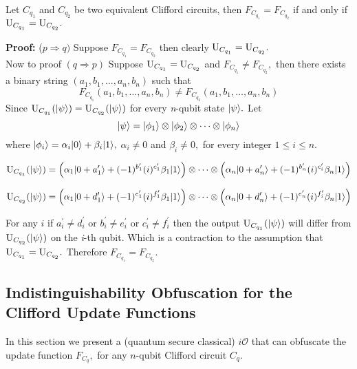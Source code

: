 \begin{lemma}
\label{sec:Clifford Functions Equivalence}
Let $C_{q_1}$ and $C_{q_2}$ be two equivalent Clifford circuits, then $F_{C_{q_1}}=F_{C_{q_2}}$ if and only if ${\rm U}_{C_{q_1}}={\rm U}_{C_{q_2}}.$
\end{lemma}
{\bf Proof:} ($p\Rightarrow q)$ Suppose $F_{C_{q_1}}=F_{C_{q_2}}$ then clearly ${\rm U}_{C_{q_1}}={\rm U}_{C_{q_2}}.$\\

		Now to proof $(q\Rightarrow p)$ Suppose ${\rm U}_{C_{q_1}}={\rm U}_{C_{q_2}}$ and $F_{C_{q_1}}\neq F_{C_{q_2}},$ then there exists a binary string $(a_1,b_1,\ldots, a_n,b_n)$ such that
		  $$ F_{C_{q_1}}(a_1,b_1,\ldots, a_n,b_n)\neq F_{C_{q_2}}(a_1,b_1,\ldots, a_n,b_n)$$
		  Since ${\rm U}_{C_{q_1}}({{\lvert}\psi\rangle})={\rm U}_{C_{q_2}}({{\lvert}\psi\rangle})$ for every {\em n}-qubit state ${{\lvert}\psi\rangle}.$ Let  $${{\lvert}\psi\rangle}={{\lvert}\phi_1\rangle} \otimes {{\lvert}\phi_2\rangle}\otimes \cdots \otimes {{\lvert}\phi_n\rangle}$$
		   where ${{\lvert}\phi_i\rangle} =\alpha_i {{\lvert}0\rangle}+ \beta_i{{\lvert}1\rangle},$  $\alpha_i\neq 0$ and $\beta_i\neq 0,$ for every integer $1\leq i\leq n.$
		
		  $${\rm U}_{C_{q_1}}({{\lvert}\psi\rangle})=\left(\alpha_1 {{\lvert}0+a^\prime_1\rangle}+(-1)^{b^\prime_1} (i)^{c^\prime_1} \beta_1{{\lvert}1\rangle}\right) \otimes \dots \otimes  \left(\alpha_n {{\lvert}0+a^\prime_n\rangle}+(-1)^{b^\prime_n} (i)^{c^\prime_i} \beta_n{{\lvert}1\rangle}\right)$$
		
		  $${\rm U}_{C_{q_2}}({{\lvert}\psi\rangle})=\left(\alpha_1 {{\lvert}0+d^\prime_1\rangle}+(-1)^{e^\prime_1} (i)^{f^\prime_1} \beta_1{{\lvert}1\rangle}\right) \otimes \dots  \otimes   \left(\alpha_n {{\lvert}0+d^\prime_n\rangle}+(-1)^{e^\prime_n} (i)^{f^\prime_i} \beta_n{{\lvert}1\rangle}\right)$$
		
		  For any $i$ if  $a^\prime_i\neq d^\prime_i$ or $b^\prime_i\neq e^\prime_i$ or $c^\prime_i\neq f^\prime_i$ then the output ${\rm U}_{C_{q_1}}({{\lvert}\psi\rangle})$ will differ from ${\rm U}_{C_{q_2}}({{\lvert}\psi\rangle})$ on the {\em i}-th qubit. Which is a contraction to the assumption that ${\rm U}_{C_{q_1}}={\rm U}_{C_{q_2}}.$  Therefore $F_{C_{q_1}}=F_{C_{q_2}}.$



\subsection{Indistinguishability Obfuscation for the Clifford Update Functions}
\label{sec: iO-clifford-functions}
In this section we present a (quantum secure classical) $i\mathcal{O}$ that can obfuscate the update function $F_{C_q},$ for any $n$-qubit Clifford circuit $C_q.$


